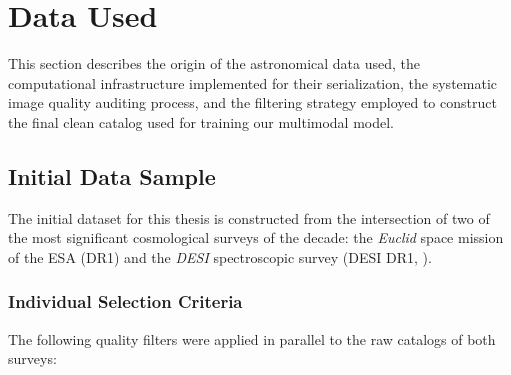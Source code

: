 
\section{Data Used} \label{sec:dat}

This section describes the origin of the astronomical data used, the computational infrastructure implemented for their serialization, the systematic image quality auditing process, and the filtering strategy employed to construct the final clean catalog used for training our multimodal model.

\subsection{Initial Data Sample}

The initial dataset for this thesis is constructed from the intersection of two of the most significant cosmological surveys of the decade: the \textit{Euclid} space mission of the \gls{ESA} (DR1) and the \textit{\gls{DESI}} spectroscopic survey (DESI DR1, \autocite{ar:desi-early-release,ar:desi-dr1-2026}).

\subsubsection{Individual Selection Criteria}

The following quality filters were applied in parallel to the raw catalogs of both surveys:

